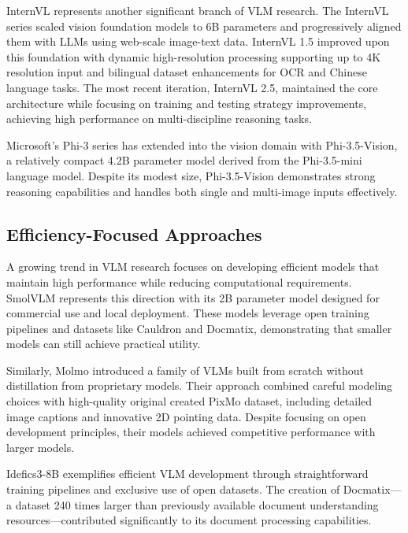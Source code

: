 \documentclass{article}
\begin{document}
InternVL represents another significant branch of VLM research. The InternVL series scaled vision foundation models to 6B parameters and progressively aligned them with LLMs using web-scale image-text data. InternVL 1.5\cite{chen2024fargpt4vclosinggapInternvl1.5} improved upon this foundation with dynamic high-resolution processing supporting up to 4K resolution input and bilingual dataset enhancements for OCR and Chinese language tasks. The most recent iteration, InternVL 2.5\cite{chen2025expandingperformanceboundariesopensourceinternvl2.5}, maintained the core architecture while focusing on training and testing strategy improvements, achieving high performance on multi-discipline reasoning tasks. 

Microsoft's Phi-3\cite{abdin2024phi3technicalreporthighly} series has extended into the vision domain with Phi-3.5-Vision\cite{abdin2024phi3technicalreporthighly}, a relatively compact 4.2B parameter model derived from the Phi-3.5-mini language model. Despite its modest size, Phi-3.5-Vision demonstrates strong reasoning capabilities and handles both single and multi-image inputs effectively. 

\subsection{Efficiency-Focused Approaches}
A growing trend in VLM research focuses on developing efficient models that maintain high performance while reducing computational requirements. SmolVLM\cite{smolvlm} represents this direction with its 2B parameter model designed for commercial use and local deployment. These models leverage open training pipelines and datasets like Cauldron and Docmatix, demonstrating that smaller models can still achieve practical utility. 

Similarly, Molmo\cite{deitke2024molmopixmoopenweights} introduced a family of VLMs built from scratch without distillation from proprietary models. Their approach combined careful modeling choices with high-quality original created PixMo dataset, including detailed image captions and innovative 2D pointing data. Despite focusing on open development principles, their models achieved competitive performance with larger models. 

Idefics3-8B\cite{laurençon2024buildingbetterunderstandingvisionlanguage} exemplifies efficient VLM development through straightforward training pipelines and exclusive use of open datasets. The creation of Docmatix—a dataset 240 times larger than previously available document understanding resources—contributed significantly to its document processing capabilities. 
\end{document}
